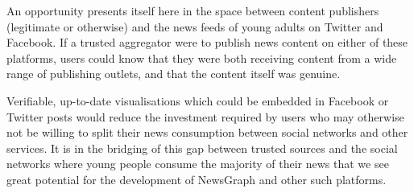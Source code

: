An opportunity presents itself here in the space between content publishers (legitimate or otherwise) and the news feeds of young adults on Twitter and Facebook. If a trusted aggregator were to publish news content on either of these platforms, users could know that they were both receiving content from a wide range of publishing outlets, and that the content itself was genuine. 

Verifiable, up-to-date visualisations which could be embedded in Facebook or Twitter posts would reduce the investment required by users who may otherwise not be willing to split their news consumption between social networks and other services. It is in the bridging of this gap between trusted sources and the social networks where young people consume the majority of their news that we see great potential for the development of NewsGraph and other such platforms. 




